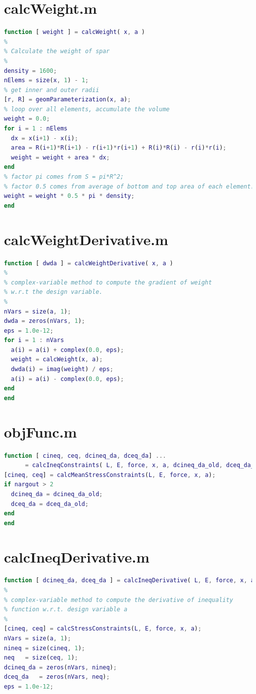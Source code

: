 \documentclass[a4paper]{article}
\begin{document}
\small
\begin{appendices} 
\section{calcWeight.m}\label{app:calcweight}
\begin{lstlisting}[language=Matlab]
function [ weight ] = calcWeight( x, a )
%
% Calculate the weight of spar
%
density = 1600;
nElems = size(x, 1) - 1;
% get inner and outer radii
[r, R] = geomParameterization(x, a);
% loop over all elements, accumulate the volume
weight = 0.0;
for i = 1 : nElems
  dx = x(i+1) - x(i);
  area = R(i+1)*R(i+1) - r(i+1)*r(i+1) + R(i)*R(i) - r(i)*r(i);
  weight = weight + area * dx;
end
% factor pi comes from S = pi*R^2; 
% factor 0.5 comes from average of bottom and top area of each element.
weight = weight * 0.5 * pi * density;
end

\end{lstlisting}

\section{calcWeightDerivative.m}\label{app:calcweightderiv}
\begin{lstlisting}[language=Matlab]
function [ dwda ] = calcWeightDerivative( x, a )
%
% complex-variable method to compute the gradient of weight
% w.r.t the design variable.
%
nVars = size(a, 1);
dwda = zeros(nVars, 1);
eps = 1.0e-12;
for i = 1 : nVars
  a(i) = a(i) + complex(0.0, eps);
  weight = calcWeight(x, a);
  dwda(i) = imag(weight) / eps;
  a(i) = a(i) - complex(0.0, eps);
end
end

\end{lstlisting}

\section{objFunc.m}\label{app:calcobj}
\begin{lstlisting}[language=Matlab]
function [ cineq, ceq, dcineq_da, dceq_da] ...
      = calcIneqConstraints( L, E, force, x, a, dcineq_da_old, dceq_da_old)
[cineq, ceq] = calcMeanStressConstraints(L, E, force, x, a);
if nargout > 2 
  dcineq_da = dcineq_da_old;
  dceq_da = dceq_da_old;
end
end

\end{lstlisting}

\section{calcIneqDerivative.m}\label{app:nonconderiv}
\begin{lstlisting}[language=Matlab]
function [ dcineq_da, dceq_da ] = calcIneqDerivative( L, E, force, x, a )
%
% complex-variable method to compute the derivative of inequality
% function w.r.t. design variable a
%
[cineq, ceq] = calcStressConstraints(L, E, force, x, a);
nVars = size(a, 1);
nineq = size(cineq, 1);
neq   = size(ceq, 1);
dcineq_da = zeros(nVars, nineq);
dceq_da   = zeros(nVars, neq);
eps = 1.0e-12;


\end{lstlisting}
\end{appendices}
\end{document}

